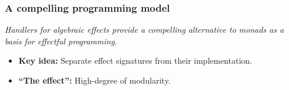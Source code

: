 
\begin{frame}
  \frametitle{A compelling programming model}
  \begin{center}
    \emph{Handlers for algebraic effects provide a compelling alternative to monads as a basis for effectful programming.}
  \end{center}
\begin{itemize}
  \item \textbf{Key idea:} Separate effect signatures from their implementation.
  \item \textbf{``The effect'':} High-degree of modularity.
\end{itemize}
\end{frame}

